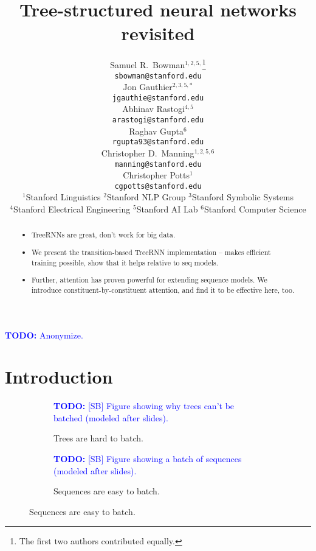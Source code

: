 \documentclass[11pt,letterpaper]{article}
\title{Tree-structured neural networks revisited}
\author{
Samuel R.\ Bowman$^{1,2,5,}$\thanks{The first two authors contributed equally.} \\
\texttt{\small sbowman@stanford.edu} \\
\And
Jon Gauthier$^{2,3,5,*}$ \\
\texttt{\small jgauthie@stanford.edu} \\
\And
Abhinav Rastogi$^{4,5}$ \\
\texttt{\small arastogi@stanford.edu} \\
\AND
Raghav Gupta$^{6}$ \\
\texttt{\small rgupta93@stanford.edu} \\
\And
Christopher D.\ Manning$^{1,2,5,6}$\\
\texttt{\small manning@stanford.edu}\\
\And
Christopher Potts$^{1}$\\
\texttt{\small cgpotts@stanford.edu}
\AND\\[-3ex]
{$^{1}$Stanford Linguistics\quad
$^{2}$Stanford NLP Group\quad
$^{3}$Stanford Symbolic Systems}\\
{$^{4}$Stanford Electrical Engineering\quad
$^{5}$Stanford AI Lab\quad
$^{6}$Stanford Computer Science}
}
\date{}
\newcommand\todo[1]{\textcolor{blue}{\textbf{TODO:} #1}}
\begin{document}
\maketitle
\begin{abstract}
\begin{itemize}
\item TreeRNNs are great, don't work for big data.
\item We present the transition-based TreeRNN implementation -- makes efficient training possible, show that it helps relative to seq models.
\item Further, attention has proven powerful for extending sequence models. We introduce constituent-by-constituent attention, and find it to be effective here, too.
\end{itemize}
\end{abstract}

\todo{Anonymize.}

\section{Introduction}

\begin{figure}[t]
\begin{subfigure}[t]{0.9\columnwidth}
\vspace{14em}
\todo{[SB] Figure showing why trees can't be batched (modeled after slides).}

\caption{\label{fig:batching:bad}Trees are hard to batch.}
\end{subfigure}

\vspace{2em}

\begin{subfigure}[t]{0.9\columnwidth}
\vspace{14em}
\todo{[SB] Figure showing a batch of sequences (modeled after slides).}

\caption{\label{fig:batching:good}Sequences are easy to batch.}
\end{subfigure}
\end{figure}
\end{document}
